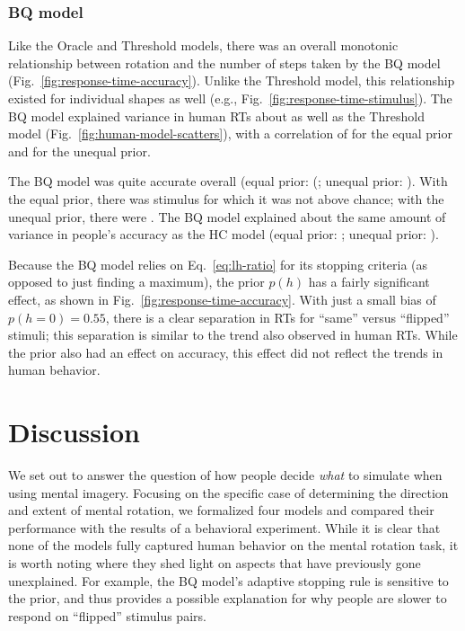 \documentclass[10pt,letterpaper]{article}
\newcommand{\Oc}[0]{Oracle}
\newcommand{\Th}[0]{Threshold}
\newcommand{\Hc}[0]{HC}
\newcommand{\Bq}[0]{BQ}
\begin{document}
\subsubsection{\Bq{} model}

Like the \Oc{} and \Th{} models, there was an overall monotonic
relationship between rotation and the number of steps taken by the
\Bq{} model (Fig.~\ref{fig:response-time-accuracy}). Unlike the \Th{}
model, this relationship existed for individual shapes as well (e.g.,
Fig.~\ref{fig:response-time-stimulus}).  The \Bq{} model explained
variance in human RTs about as well as the \Th{} model
(Fig.~\ref{fig:human-model-scatters}), with a correlation of
\BqTimeCorr{} for the equal prior and \BqpTimeCorr{} for the unequal
prior.

The \Bq{} model was quite accurate overall (equal prior:
(\BqAccuracy{}; unequal prior: \BqpAccuracy{}). With the equal prior,
there was \BqNumChance{} stimulus for which it was not above chance;
with the unequal prior, there were \BqpNumChance{}. The \Bq{} model
explained about the same amount of variance in people's accuracy as
the \Hc{} model (equal prior: \BqAccuracyCorr{}; unequal prior:
\BqpAccuracyCorr{}).

Because the \Bq{} model relies on Eq.~\ref{eq:lh-ratio} for its
stopping criteria (as opposed to just finding a maximum), the prior
$p(h)$ has a fairly significant effect, as shown in
Fig.~\ref{fig:response-time-accuracy}. With just a small bias of
$p(h=0)=0.55$, there is a clear separation in RTs for ``same'' versus
``flipped'' stimuli; this separation is similar to the trend also
observed in human RTs. While the prior also had an effect on accuracy,
this effect did not reflect the trends in human behavior.

\section{Discussion}

We set out to answer the question of how people decide \textit{what}
to simulate when using mental imagery. Focusing on the specific case
of determining the direction and extent of mental rotation, we
formalized four models and compared their performance with the results
of a behavioral experiment. While it is clear that none of the models
fully captured human behavior on the mental rotation task, it is worth
noting where they shed light on aspects that have previously gone
unexplained.  For example, the \Bq{} model's adaptive stopping rule is
sensitive to the prior, and thus provides a possible explanation for
why people are slower to respond on ``flipped'' stimulus pairs.
\end{document}
